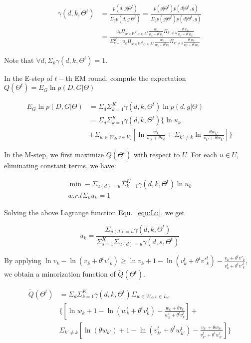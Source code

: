\documentclass[sigconf]{acmart}
\begin{document}
\begin{align}\label{equ:conditional}
\gamma(d,k,\Theta^t) &=\frac{p(d,g|\Theta^t)}{\Sigma_g p(d,g|\Theta^t)} = \frac{p(g|\Theta^t)p(d|\Theta^t,g)}{\Sigma_g p(g|\Theta^t)p(d|\Theta^t,g)}\\\nonumber
&=\frac{u_k \Pi_{w \in W^d, v\in L^d} \frac{w_k}{w_k+\theta^t v_k}\Pi_{k'\neq k}\frac{\theta^t w_{k'}}{v_{k'}+\theta^t w_{k'}}}{\Sigma_{k=1}^K u_k \Pi_{w \in W^d, v\in L^d} \frac{w_k}{w_k+\theta^t v_k}\Pi_{k'\neq k}\frac{\theta^t w_{k'}}{v_{k'}+\theta^t w_{k'}}}
\end{align}

Note that $\forall d, \Sigma_k \gamma(d,k,\Theta^t)=1$.

In the E-step of $t-$th  EM round, compute the expectation $Q(\Theta^t)=E_{G} \ln p(D,G|\Theta) $

\begin{align}\label{equ:estep}
E_{G} \ln p(D,G|\Theta) & = \Sigma_d \Sigma_{k=1}^K \gamma(d,k,\Theta^t) \ln p(d,g|\Theta)\\\nonumber
& = \Sigma_d \Sigma_{k=1}^K \gamma(d,k,\Theta^t) \{ \ln u_k \\ \nonumber
&+ \Sigma_{w\in W_d, v\in V_d} [\ln \frac{w_k}{w_k +\theta v_k} +\Sigma_{k'\neq k} \ln \frac{\theta w_{k'}}{v_{k'}+\theta w_{k'}}]\}
\end{align}

In the M-step, we first maximize $Q(\Theta^t)$ with respect to $U$. For each $u \in U$, eliminating constant terms, we have:

\begin{align}\label{equ:Lu}
\min -\Sigma_{u(d)=u} \Sigma_{k=1}^K \gamma(d,k,\Theta^t) \ln u_k\\ \nonumber
w.r.t \Sigma_k u_k =1
\end{align}
 
Solving the above Lagrange function Equ.~\ref{equ:Lu}, we get 

\begin{equation}\label{equ:u}
u_k =\frac{\Sigma_{u(d)=u}\gamma(d,k,\Theta^t)}{\Sigma_{s=1}^K \Sigma_{u(d)=u}\gamma(d,s,\Theta^t)}
\end{equation}

By applying $\ln v_k - \ln (v_k + \theta^t v'_k) \geq \ln v_k + 1 - \ln (v_k^t + \theta^t {v'}_k^t) - \frac{v_k + \theta^t v'_k}{v_k^t + \theta^t {v'}_k^t}$, we obtain a minorization function of $\tilde{Q}(\Theta^t)$.

\begin{align}\label{equ:minorization}
\tilde{Q}(\Theta^t) &= \Sigma_d \Sigma_{k=1}^K \gamma(d,k,\Theta^t)  \Sigma_{w\in W_d, v\in L_d} \\\nonumber
& \{ [\ln w_k + 1 - \ln (w_k^t + \theta^t v_k^t) - \frac{w_k+\theta v_k}{w_k^t + \theta^tv_k^t}]+\\\nonumber
&\Sigma_{k'\neq k} [\ln (\theta w_{k'}) + 1 - \ln (v_{k'}^t + \theta^t w_{k'}^t) -  \frac{v_{k'}+\theta w_{k'}}{v_{k'}^t + \theta^tw_{k'}^t}]
\}
\end{align}
\end{document}
